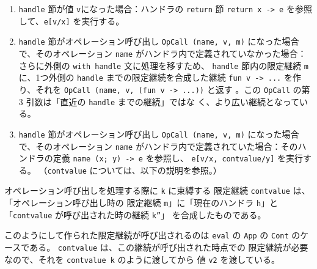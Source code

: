 \begin{enumerate}
\item \texttt{handle} 節が値 \texttt{v}になった場合：ハンドラの \texttt{return} 節 \texttt{return x -> e} を参照して、\texttt{e[v/x]} を実行する。
\item \texttt{handle} 節がオペレーション呼び出し \texttt{OpCall (name, v, m)} になった場合で、そのオペレーション \texttt{name} がハンドラ内で定義されていなかった場合：
さらに外側の \texttt{with handle} 文に処理を移すため、
\texttt{handle} 節内の限定継続 \texttt{m} に、1つ外側の \texttt{handle} までの限定継続を合成した継続 \texttt{fun v -> ...} を作り、それを \texttt{OpCall (name, v, (fun v -> ...))} と返す
。この \texttt{OpCall} の第 3 引数は「直近の \texttt{handle} までの継続」ではな
く、より広い継続となっている。

\item \texttt{handle} 節がオペレーション呼び出し \texttt{OpCall (name, v, m)} になった場合で、そのオペレーション \texttt{name} がハンドラ内で定義されていた場合：そのハンドラの定義 \texttt{name (x; y) -> e} を参照し、
\texttt{e[v/x, cont\US{}value/y]} を実行する。
（\texttt{cont\US{}value} については、以下の説明を参照。）
\end{enumerate}

オペレーション呼び出しを処理する際に \texttt{k} に束縛する
限定継続 \texttt{cont\US{}value} は、「オペレーション呼び出し時の
限定継続 \texttt{m}」に「現在のハンドラ \texttt{h}」と
「\texttt{cont\US{}value} が呼び出された時の継続 \texttt{k''}」
を合成したものである。

このようにして作られた限定継続が呼び出されるのは \texttt{eval} の
\texttt{App} の \texttt{Cont} のケースである。
\texttt{cont\US{}value} は、この継続が呼び出された時点での
限定継続が必要なので、それを \texttt{cont\US{}value k} のように渡してから
値 \texttt{v2} を渡している。

